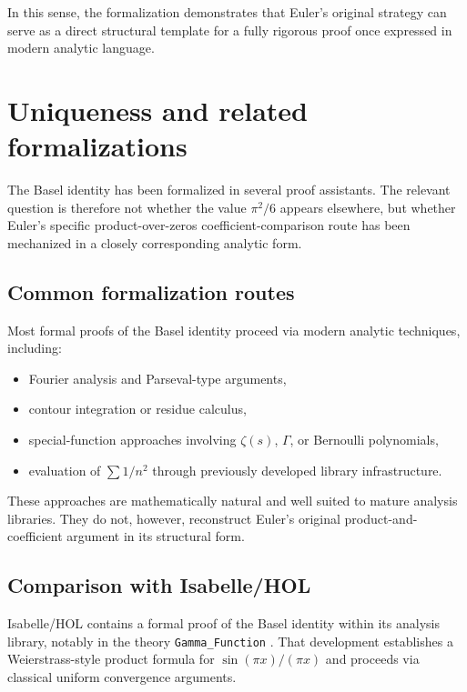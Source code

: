 \documentclass[11pt,a4paper]{article}
\theoremstyle{plain}
\theoremstyle{definition}
\begin{document}
In this sense, the formalization demonstrates that Euler’s original strategy can serve as a direct structural template for a fully rigorous proof once expressed in modern analytic language.

\section{Uniqueness and related formalizations}

The Basel identity has been formalized in several proof assistants. The relevant question is therefore not whether the value \(\pi^{2}/6\) appears elsewhere, but whether Euler’s specific product-over-zeros coefficient-comparison route has been mechanized in a closely corresponding analytic form.

\subsection{Common formalization routes}

Most formal proofs of the Basel identity proceed via modern analytic techniques, including:

\begin{itemize}[leftmargin=2em]
  \item Fourier analysis and Parseval-type arguments,
  \item contour integration or residue calculus,
  \item special-function approaches involving \(\zeta(s)\), \(\Gamma\), or Bernoulli polynomials,
  \item evaluation of \(\sum 1/n^{2}\) through previously developed library infrastructure.
\end{itemize}

These approaches are mathematically natural and well suited to mature analysis libraries. They do not, however, reconstruct Euler’s original product-and-coefficient argument in its structural form.

\subsection{Comparison with Isabelle/HOL}

Isabelle/HOL contains a formal proof of the Basel identity within its analysis library, notably in the theory \texttt{Gamma\_Function} \cite{IsabelleHOLAnalysisGammaFunction}. That development establishes a Weierstrass-style product formula for \(\sin(\pi x)/(\pi x)\) and proceeds via classical uniform convergence arguments.
\end{document}

